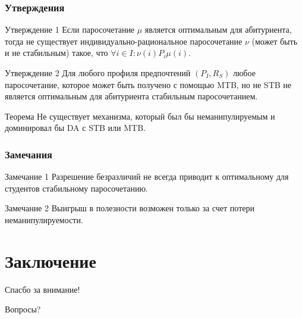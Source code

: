\documentclass[10pt,pdf,hyperref={unicode}]{beamer}
\begin{document}
\begin{frame}
    \frametitle{Утверждения}
    \begin{block}{Утверждение 1}
        Если паросочетание $\mu$ является оптимальным для абитуриента, тогда не существует индивидуально-рациональное паросочетание $\nu$ (может быть и не стабильным) такое, что $\forall i \in I: \nu(i) P_i \mu(i)$.
    \end{block}

    \begin{block}{Утверждение 2}
        Для любого профиля предпочтений $(P_I, R_S)$ любое паросочетание, которое может быть получено с помощью MTB, но не STB не является оптимальным для абитуриента стабильным паросочетанием.
    \end{block}

    \begin{block}{Теорема}
        Не существует механизма, который был бы неманипулируемым и доминировал бы DA с STB или MTB.
    \end{block}
\end{frame}

\begin{frame}
    \frametitle{Замечания}
    \begin{block}{Замечание 1}
        Разрешение безразличий не всегда приводит к оптимальному для студентов стабильному паросочетанию.
    \end{block}

    \begin{block}{Замечание 2}
        Выигрыш в полезности возможен только за счет потери неманипулируемости.
    \end{block}
\end{frame}

\section{Заключение}

\begin{frame}
    \begin{center}
        {\Large Спасбо за внимание!}
    \end{center}

    \begin{center}
        {\Large Вопросы?}
    \end{center}
\end{frame}

\begin{frame}
    \begin{figure}[H]
        \noindent{}
    \end{figure}
\end{frame}

\begin{frame}
    \begin{figure}[H]
        \noindent{}
    \end{figure}
\end{frame}
\end{document}
